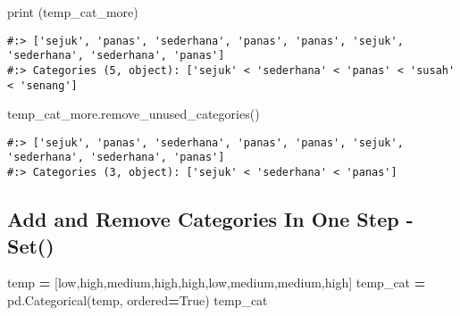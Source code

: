 \documentclass[
]{book}
\newenvironment{Shaded}{\begin{snugshade}}{\end{snugshade}}
\newcommand{\BuiltInTok}[1]{#1}
\newcommand{\NormalTok}[1]{#1}
\newcommand{\OperatorTok}[1]{\textcolor[rgb]{0.43,0.43,0.43}{\textbf{#1}}}
\newcommand{\StringTok}[1]{\textcolor[rgb]{0.5,0.5,0.5}{#1}}
\newcommand{\VariableTok}[1]{\textcolor[rgb]{0,0,0}{#1}}
\begin{document}
\begin{Shaded}
\begin{Highlighting}[]
\BuiltInTok{print}\NormalTok{ (temp\_cat\_more)}
\end{Highlighting}
\end{Shaded}

\begin{verbatim}
#:> ['sejuk', 'panas', 'sederhana', 'panas', 'panas', 'sejuk', 'sederhana', 'sederhana', 'panas']
#:> Categories (5, object): ['sejuk' < 'sederhana' < 'panas' < 'susah' < 'senang']
\end{verbatim}

\begin{Shaded}
\begin{Highlighting}[]
\NormalTok{temp\_cat\_more.remove\_unused\_categories()}
\end{Highlighting}
\end{Shaded}

\begin{verbatim}
#:> ['sejuk', 'panas', 'sederhana', 'panas', 'panas', 'sejuk', 'sederhana', 'sederhana', 'panas']
#:> Categories (3, object): ['sejuk' < 'sederhana' < 'panas']
\end{verbatim}

\hypertarget{add-and-remove-categories-in-one-step---set}{%
\subsection{Add and Remove Categories In One Step - Set()}\label{add-and-remove-categories-in-one-step---set}}

\begin{Shaded}
\begin{Highlighting}[]
\NormalTok{temp }\OperatorTok{=}\NormalTok{ [}\StringTok{\textquotesingle{}low\textquotesingle{}}\NormalTok{,}\StringTok{\textquotesingle{}high\textquotesingle{}}\NormalTok{,}\StringTok{\textquotesingle{}medium\textquotesingle{}}\NormalTok{,}\StringTok{\textquotesingle{}high\textquotesingle{}}\NormalTok{,}\StringTok{\textquotesingle{}high\textquotesingle{}}\NormalTok{,}\StringTok{\textquotesingle{}low\textquotesingle{}}\NormalTok{,}\StringTok{\textquotesingle{}medium\textquotesingle{}}\NormalTok{,}\StringTok{\textquotesingle{}medium\textquotesingle{}}\NormalTok{,}\StringTok{\textquotesingle{}high\textquotesingle{}}\NormalTok{]}
\NormalTok{temp\_cat }\OperatorTok{=}\NormalTok{ pd.Categorical(temp, ordered}\OperatorTok{=}\VariableTok{True}\NormalTok{)}
\NormalTok{temp\_cat}
\end{Highlighting}
\end{Shaded}
\end{document}
